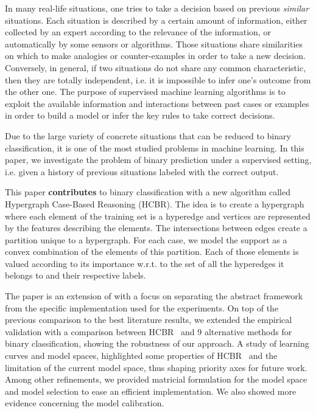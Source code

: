 \documentclass[preprint,12pt]{elsarticle}
\def\HCBR{{\sc HCBR}}
\theoremstyle{definition}
\begin{document}
In many real-life situations, one tries to take a decision based on previous {\it similar} situations. Each situation is described by a certain amount of information, either collected by an expert according to the relevance of the information, or automatically by some sensors or algorithms. Those situations share similarities on which to make analogies or counter-examples in order to take a new decision. Conversely, in general, if two situations do not share any common characteristic, then they are totally independent, i.e. it is impossible to infer one's outcome from the other one. The purpose of supervised machine learning algorithms is to exploit the available information and interactions between past cases or examples in order to build a model or infer the key rules to take correct decisions.

Due to the large variety of concrete situations that can be reduced to binary classification, it is one of the most studied problems in machine learning. In this paper, we investigate the problem of binary prediction under a supervised setting, i.e. given a history of previous situations labeled with the correct output.

This paper {\bf contributes} to binary classification with a new algorithm called Hypergraph Case-Based Reasoning (\HCBR). The idea is to create a hypergraph where each element of the training set is a hyperedge and vertices are represented by the features describing the elements. The intersections between edges create a partition unique to a hypergraph. For each case, we model the support as a convex combination of the elements of this partition. Each of those elements is valued according to its importance w.r.t. to the set of all the hyperedges it belongs to and their respective labels.

The paper is an extension of \cite{DBLP:conf/dolap/Quemy18} with a focus on separating the abstract framework from the specific implementation used for the experiments. On top of the previous comparison to the best literature results, we extended the empirical validation with a comparison between \HCBR~ and 9 alternative methods for binary classification, showing the robustness of our approach. A study of learning curves and model spaces, highlighted some properties of \HCBR~ and the limitation of the current model space, thus shaping priority axes for future work. Among other refinements, we provided matricial formulation for the model space and model selection to ease an efficient implementation. We also showed more evidence concerning the model calibration.
\end{document}
